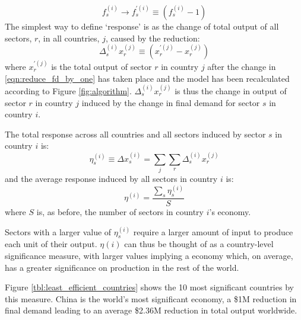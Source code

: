 \documentclass[a4paper]{article}
\begin{document}
\begin{equation}\label{eqn:reduce_fd_by_one}
f_s^{(i)} \rightarrow f_s^{\prime (i)} \equiv (f_s^{(i)} - 1)
\end{equation}
The simplest way to define `response' is as the change of total output of all sectors, $r$, in all countries, $j$, caused by the reduction:
\begin{equation}
\Delta_{s}^{(i)} x_{r}^{(j)} \equiv (x_{r}^{\prime(j)} - x_r^{(j)})
\end{equation}
where $x_{r}^{\prime(j)}$ is the total output of sector $r$ in country $j$ after the change in \cref{eqn:reduce_fd_by_one} has taken place and the model has been recalculated according to Figure \ref{fig:algorithm}.
$\Delta_{s}^{(i)} x_{r}^{(j)}$ is thus the change in output of sector $r$ in country $j$ induced by the change in final demand for sector $s$ in country $i$.

The total response across all countries and all sectors induced by sector $s$ in country $i$ is:
\begin{equation}
\eta_s^{(i)} \equiv \Delta x_{s}^{(i)} = \sum_j \sum_r \Delta_{s}^{(i)} x_{r}^{(j)}
\end{equation}
and the average response induced by all sectors in country $i$ is:
\begin{equation}
\eta^{(i)} = \frac{\sum_s \eta_s^{(i)}}{S}
\end{equation}
where $S$ is, as before, the number of sectors in country $i$'s economy.

Sectors with a larger value of $\eta_s^{(i)}$ require a larger amount of input to produce each unit of their output. $\eta{(i)}$ can thus be thought of as a country-level significance measure, with larger values implying a economy which, on average, has a greater significance on production in the rest of the world.

Figure \ref{tbl:least_efficient_countries} shows the 10 most significant countries by this measure.
China is the world's most significant economy, a \$1M reduction in final demand leading to an average \$2.36M reduction in total output worldwide.
\end{document}
